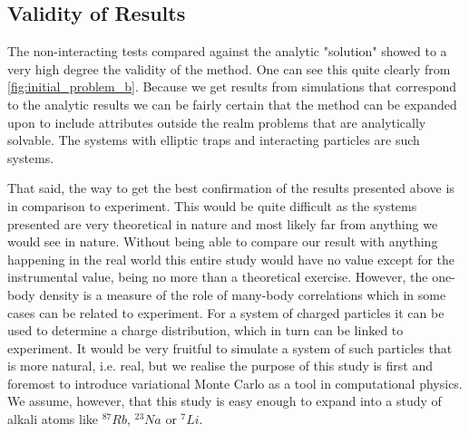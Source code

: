 \documentclass[
    a4paper, aps, twocolumn, floatfix, superscriptaddress,
    nofootinbib]{revtex4-1}
\newcommand{\1}{\mathds{1}}
\begin{document}
    \subsection{Validity of Results}
        The non-interacting tests compared against the analytic "solution"
        showed to a very high degree the validity of the method. One can see
        this quite clearly from \autoref{fig:initial_problem_b}. Because we get
        results from simulations that correspond to the analytic results we can
        be fairly certain that the method can be expanded upon to include
        attributes outside the realm problems that are analytically solvable.
        The systems with elliptic traps and interacting particles are such
        systems.
        
        That said, the way to get the best confirmation of the results presented 
        above is in comparison to experiment. This would be quite difficult
        as the systems presented are very theoretical in nature and most likely
        far from anything we would see in nature. Without being able to compare 
        our result with anything happening in the real world this entire study would
        have no value except for the instrumental value, being no more than
        a theoretical exercise.  However, the one-body
        density is a measure of the role of many-body correlations which in
        some cases can be related to experiment. For a system of charged 
        particles it can be used to determine a charge distribution, which in
        turn can be linked to experiment. It would be very fruitful to simulate a
        system of such particles that is more natural, i.e. real, but we realise the
        purpose of this study is first and foremost to introduce variational 
        Monte Carlo as a tool in computational physics. We assume, however,
        that this study is easy enough to expand into a study of alkali atoms like
        $^{87}Rb$, $^{23}Na$ or $^7Li$.
\end{document}
